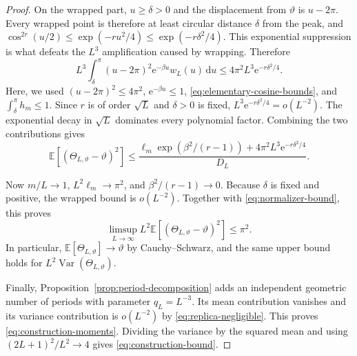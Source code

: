 \documentclass[10pt,a4paper]{amsart}
\newcommand{\E}{\mathbb E}
\newcommand{\Var}{\operatorname{Var}}
\newcommand{\dd}{\,\mathrm d}
\newcommand{\e}{\mathrm e}
\begin{document}
\begin{proof}
On the wrapped part, $u\geq\delta>0$ and the displacement from $\vartheta$ is $u-2\pi$. Every wrapped point is therefore at least circular distance $\delta$ from the peak, and $\cos^{2r}(u/2)\leq\exp(-ru^2/4)\leq\exp(-r\delta^2/4)$. This exponential suppression is what defeats the $L^3$ amplification caused by wrapping. Therefore
\[
  L^3\int_{\delta}^{\pi}(u-2\pi)^2\e^{-\beta u}w_L(u)\dd u
  \leq4\pi^2L^3\e^{-r\delta^2/4}.
\]
Here, we used $(u-2\pi)^2\leq4\pi^2$, $\e^{-\beta u}\leq1$, \eqref{eq:elementary-cosine-bounds}, and $\int_{\delta}^{\pi}h_m\leq1$. Since $r$ is of order $\sqrt L$ and $\delta>0$ is fixed, $L^3\e^{-r\delta^2/4}=o(L^{-2})$. The exponential decay in $\sqrt L$ dominates every polynomial factor. Combining the two contributions gives
\[
  \E\!\left[(\Theta_{L,\vartheta}-\vartheta)^2\right]
  \leq\frac{\ell_m\exp(\beta^2/(r-1))
                  +4\pi^2L^3\e^{-r\delta^2/4}}{D_L}.
\]

Now $m/L\to1$, $L^2\ell_m\to\pi^2$, and $\beta^2/(r-1)\to0$. Because $\delta$ is fixed and positive, the wrapped bound is $o(L^{-2})$. Together with \eqref{eq:normalizer-bound}, this proves
\[
  \limsup_{L\to\infty}
  L^2\E\!\left[(\Theta_{L,\vartheta}-\vartheta)^2\right]\leq\pi^2.
\]
In particular, $\E[\Theta_{L,\vartheta}]\to\vartheta$ by Cauchy--Schwarz, and the same upper bound holds for $L^2\Var(\Theta_{L,\vartheta})$.

Finally, Proposition~\ref{prop:period-decomposition} adds an independent geometric number of periods with parameter $q_L=L^{-3}$. Its mean contribution vanishes and its variance contribution is $o(L^{-2})$ by \eqref{eq:replica-negligible}. This proves \eqref{eq:construction-moments}. Dividing the variance by the squared mean and using $(2L+1)^2/L^2\to4$ gives \eqref{eq:construction-bound}.
\end{proof}
\end{document}
